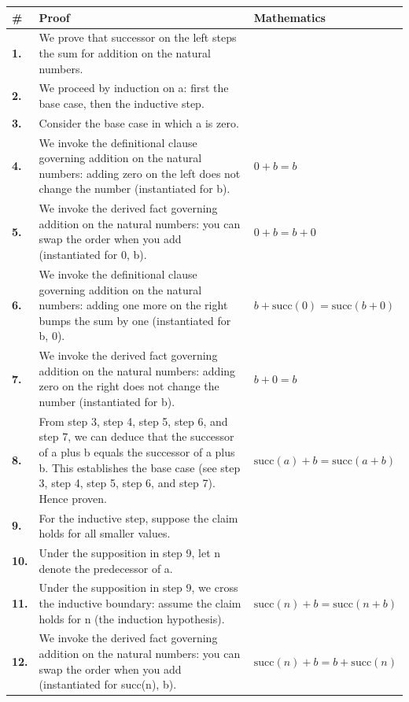 \documentclass[11pt]{article}
\theoremstyle{definition}
\begin{document}
\begin{tabular}{@{} >{\raggedright\arraybackslash}p{} >{\raggedright\arraybackslash}p{} >{\raggedleft\arraybackslash}p{} @{}}
\textbf{\#} & \textbf{Proof} & \textbf{Mathematics} \\
\midrule
\textbf{1.} & We prove that successor on the left steps the sum for addition on the natural numbers. & \\[0.45em]
\textbf{2.} & We proceed by induction on a: first the base case, then the inductive step. & \\[0.45em]
\textbf{3.} & Consider the base case in which a is zero. & \\[0.45em]
\textbf{4.} & We invoke the definitional clause governing addition on the natural numbers: adding zero on the left does not change the number (instantiated for b). & $\displaystyle 0 + b = b$ \\[0.45em]
\textbf{5.} & We invoke the derived fact governing addition on the natural numbers: you can swap the order when you add (instantiated for 0, b). & $\displaystyle 0 + b = b + 0$ \\[0.45em]
\textbf{6.} & We invoke the definitional clause governing addition on the natural numbers: adding one more on the right bumps the sum by one (instantiated for b, 0). & $\displaystyle b + \mathrm{succ}(0) = \mathrm{succ}(b + 0)$ \\[0.45em]
\textbf{7.} & We invoke the derived fact governing addition on the natural numbers: adding zero on the right does not change the number (instantiated for b). & $\displaystyle b + 0 = b$ \\[0.45em]
\textbf{8.} & From step 3, step 4, step 5, step 6, and step 7, we can deduce that the successor of a plus b equals the successor of a plus b. This establishes the base case (see step 3, step 4, step 5, step 6, and step 7). Hence proven. & $\displaystyle \mathrm{succ}(a) + b = \mathrm{succ}(a + b)$ \\[0.45em]
\textbf{9.} & For the inductive step, suppose the claim holds for all smaller values. & \\[0.45em]
\textbf{10.} & Under the supposition in step 9, let n denote the predecessor of a. & \\[0.45em]
\textbf{11.} & Under the supposition in step 9, we cross the inductive boundary: assume the claim holds for n (the induction hypothesis). & $\displaystyle \mathrm{succ}(n) + b = \mathrm{succ}(n + b)$ \\[0.45em]
\textbf{12.} & We invoke the derived fact governing addition on the natural numbers: you can swap the order when you add (instantiated for succ(n), b). & $\displaystyle \mathrm{succ}(n) + b = b + \mathrm{succ}(n)$ \\[0.45em]

\end{tabular}
\end{document}
